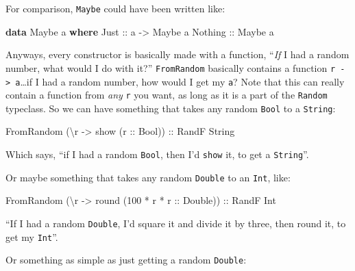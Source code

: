 \documentclass[]{article}
\newenvironment{Shaded}{}{}
\newcommand{\KeywordTok}[1]{\textcolor[rgb]{0.00,0.44,0.13}{\textbf{{#1}}}}
\newcommand{\DataTypeTok}[1]{\textcolor[rgb]{0.56,0.13,0.00}{{#1}}}
\newcommand{\DecValTok}[1]{\textcolor[rgb]{0.25,0.63,0.44}{{#1}}}
\newcommand{\OtherTok}[1]{\textcolor[rgb]{0.00,0.44,0.13}{{#1}}}
\newcommand{\FunctionTok}[1]{\textcolor[rgb]{0.02,0.16,0.49}{{#1}}}
\newcommand{\NormalTok}[1]{{#1}}
\begin{document}
For comparison, \texttt{Maybe} could have been written like:

\begin{Shaded}
\begin{Highlighting}[]
\KeywordTok{data} \DataTypeTok{Maybe} \NormalTok{a }\KeywordTok{where}
    \DataTypeTok{Just}\OtherTok{    ::} \NormalTok{a }\OtherTok{->} \DataTypeTok{Maybe} \NormalTok{a}
    \DataTypeTok{Nothing}\OtherTok{ ::} \DataTypeTok{Maybe} \NormalTok{a}
\end{Highlighting}
\end{Shaded}

Anyways, every constructor is basically made with a function,
``\emph{If} I had a random number, what would I do with it?''
\texttt{FromRandom} basically contains a function
\texttt{r\ -\textgreater{}\ a}\ldots{}if I had a random number, how
would I get my \texttt{a}? Note that this can really contain a function
from \emph{any} \texttt{r} you want, as long as it is a part of the
\texttt{Random} typeclass. So we can have something that takes any
random \texttt{Bool} to a \texttt{String}:

\begin{Shaded}
\begin{Highlighting}[]
\DataTypeTok{FromRandom} \NormalTok{(\textbackslash{}r }\OtherTok{->} \NormalTok{show (}\OtherTok{r ::} \DataTypeTok{Bool}\NormalTok{))}\OtherTok{ ::} \DataTypeTok{RandF} \DataTypeTok{String}
\end{Highlighting}
\end{Shaded}

Which says, ``if I had a random \texttt{Bool}, then I'd \texttt{show}
it, to get a \texttt{String}''.

Or maybe something that takes any random \texttt{Double} to an
\texttt{Int}, like:

\begin{Shaded}
\begin{Highlighting}[]
\DataTypeTok{FromRandom} \NormalTok{(\textbackslash{}r }\OtherTok{->} \NormalTok{round (}\DecValTok{100} \FunctionTok{*} \NormalTok{r }\FunctionTok{*}\OtherTok{ r ::} \DataTypeTok{Double}\NormalTok{))}\OtherTok{ ::} \DataTypeTok{RandF} \DataTypeTok{Int}
\end{Highlighting}
\end{Shaded}

``If I had a random \texttt{Double}, I'd square it and divide it by
three, then round it, to get my \texttt{Int}''.

Or something as simple as just getting a random \texttt{Double}:
\end{document}
